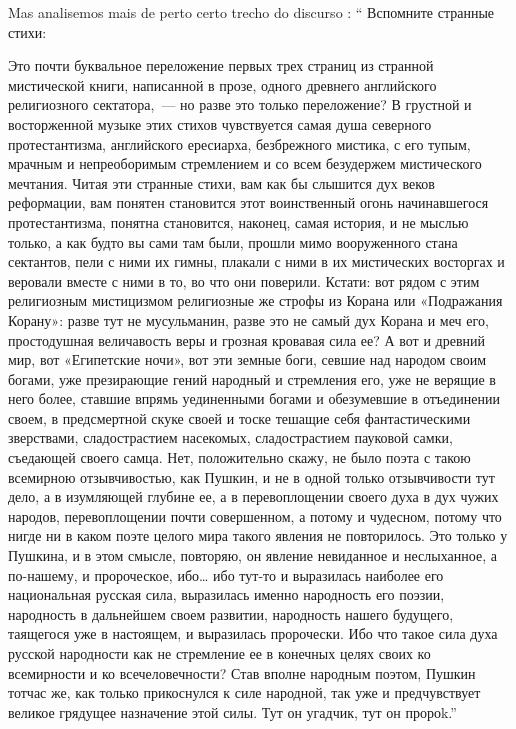 Mas analisemos mais de perto certo trecho do discurso : `` Вспомните
странные стихи:


Это почти буквальное переложение первых трех страниц из странной
мистической книги, написанной в прозе, одного древнего английского
религиозного сектатора,~--- но разве это только переложение? В грустной
и восторженной музыке этих стихов чувствуется самая душа северного
протестантизма, английского ересиарха, безбрежного мистика, с его тупым,
мрачным и непреоборимым стремлением и со всем безудержем мистического
мечтания. Читая эти странные стихи, вам как бы слышится дух веков
реформации, вам понятен становится этот воинственный огонь начинавшегося
протестантизма, понятна становится, наконец, самая история, и не мыслью
только, а как будто вы сами там были, прошли мимо вооруженного стана
сектантов, пели с ними их гимны, плакали с ними в их мистических
восторгах и веровали вместе с ними в то, во что они поверили. Кстати:
вот рядом с этим религиозным мистицизмом религиозные же строфы из Корана
или «Подражания Корану»: разве тут не мусульманин, разве это не самый
дух Корана и меч его, простодушная величавость веры и грозная кровавая
сила ее? А вот и древний мир, вот «Египетские ночи», вот эти земные
боги, севшие над народом своим богами, уже презирающие гений народный и
стремления его, уже не верящие в него более, ставшие впрямь уединенными
богами и обезумевшие в отъединении своем, в предсмертной скуке своей и
тоске тешащие себя фантастическими зверствами, сладострастием насекомых,
сладострастием пауковой самки, съедающей своего самца. Нет, положительно
скажу, не было поэта с такою всемирною отзывчивостью, как Пушкин, и не в
одной только отзывчивости тут дело, а в изумляющей глубине ее, а в
перевоплощении своего духа в дух чужих народов, перевоплощении почти
совершенном, а потому и чудесном, потому что нигде ни в каком поэте
целого мира такого явления не повторилось. Это только у Пушкина, и в
этом смысле, повторяю, он явление невиданное и неслыханное, а по-нашему,
и пророческое, ибо\ldots{} ибо тут-то и выразилась наиболее его
национальная русская сила, выразилась именно народность его поэзии,
народность в дальнейшем своем развитии, народность нашего будущего,
таящегося уже в настоящем, и выразилась пророчески. Ибо что такое сила
духа русской народности как не стремление ее в конечных целях своих {ко
всемирности и ко всечеловечности?} Став вполне народным поэтом, Пушкин
тотчас же, как только прикоснулся к силе народной, так уже и
предчувствует великое грядущее назначение этой силы. Тут он угадчик, тут
он пророk.''

